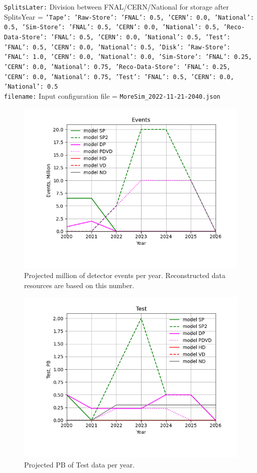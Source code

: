 {\tt SplitsLater:} Division between FNAL/CERN/National for storage after SplitsYear = {\tt {'Tape': {'Raw-Store': {'FNAL': 0.5, 'CERN': 0.0, 'National': 0.5}, 'Sim-Store': {'FNAL': 0.5, 'CERN': 0.0, 'National': 0.5}, 'Reco-Data-Store': {'FNAL': 0.5, 'CERN': 0.0, 'National': 0.5}, 'Test': {'FNAL': 0.5, 'CERN': 0.0, 'National': 0.5}}, 'Disk': {'Raw-Store': {'FNAL': 1.0, 'CERN': 0.0, 'National': 0.0}, 'Sim-Store': {'FNAL': 0.25, 'CERN': 0.0, 'National': 0.75}, 'Reco-Data-Store': {'FNAL': 0.25, 'CERN': 0.0, 'National': 0.75}, 'Test': {'FNAL': 0.5, 'CERN': 0.0, 'National': 0.5}}}} \\
{\tt filename:} Input configuration file = {\tt MoreSim\_2022-11-21-2040.json} \\
\begin{figure}[h]
\centering\includegraphics[height=0.4\textwidth]{MoreSim_2022-11-21-2026/MoreSim_2022-11-21-2026-Events.png}
\caption{Projected million of detector events per year.  Reconstructed data resources are based on this number.}
\label{fig:Events}
\end{figure}
\begin{figure}[h]
\centering\includegraphics[height=0.4\textwidth]{MoreSim_2022-11-21-2026/MoreSim_2022-11-21-2026-Test.png}
\caption{Projected PB of Test data per year.}
\label{fig:Test}
\end{figure}
